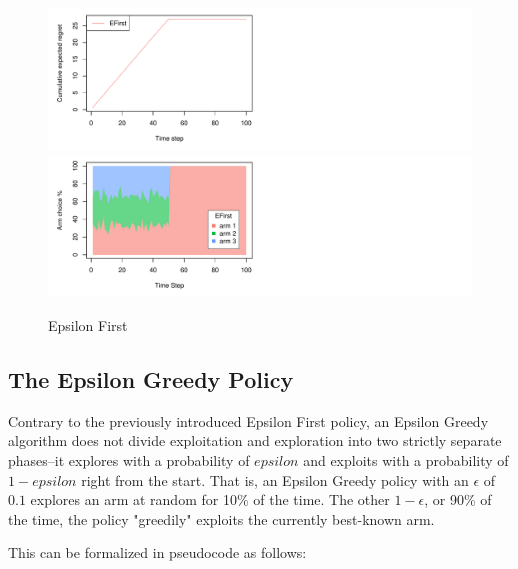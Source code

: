 \documentclass[nojss]{jss}\usepackage[]{graphicx}\usepackage[]{color}
\makeatletter
\def\maxwidth{ %
  \ifdim\Gin@nat@width>\linewidth
    \linewidth
  \else
    \Gin@nat@width
  \fi
}
\newenvironment{knitrout}{}{} %
\makeatother
\begin{document}
\begin{knitrout}
\color{fgcolor}\begin{figure}[H]
\includegraphics[width=\maxwidth,]{fig/efpolicy-1} 
\includegraphics[width=\maxwidth,]{fig/efpolicy-2} \caption[Epsilon First]{Epsilon First}\label{fig:efpolicy}
\end{figure}


\end{knitrout}


\subsection{The Epsilon Greedy Policy}

Contrary to the previously introduced Epsilon First policy, an Epsilon Greedy algorithm does not divide exploitation and exploration into two strictly separate phases--it explores with a probability of $epsilon$ and exploits with a probability of $1-epsilon$ right from the start. That is, an Epsilon Greedy policy with an $\epsilon$ of $0.1$ explores an arm at random for 10\% of the time. The other $1-\epsilon$, or 90\% of the time, the policy "greedily" exploits the currently best-known arm.

This can be formalized in pseudocode as follows:
\end{document}
